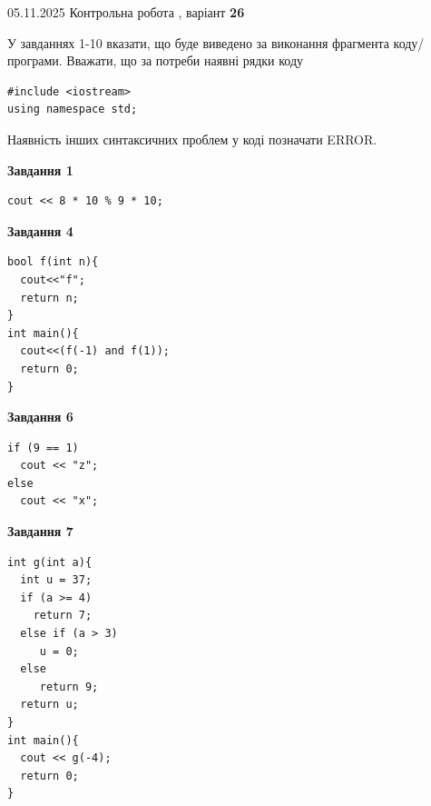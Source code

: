 \documentclass[12pt, ukrainian]{article}
\begin{document}
{\Large{05.11.2025 Контрольна робота , варіант  \No \textbf { 26 }\par}}
{
\begin {large}
У завданнях 1-10 вказати, що буде виведено за виконання фрагмента коду/про\-гра\-ми.
Вважати, що за потреби наявні рядки коду
\begin{verbatim}
#include <iostream>
using namespace std;
\end{verbatim}
Наявність інших синтаксичних проблем у коді позначати ERROR.

\begin{minipage}[t]{7.0cm}

\begin{center}
\textbf{Завдання 1}
\end{center}
\vspace{-8mm}

\begin{verbatim}
cout << 8 * 10 % 9 * 10;
\end{verbatim}



\begin{center}
\textbf{Завдання 4}
\end{center}
\vspace{-8mm}

\begin{verbatim}
bool f(int n){
  cout<<"f";
  return n;
}
int main(){
  cout<<(f(-1) and f(1));
  return 0;
}
\end{verbatim}



\begin{center}
\textbf{Завдання 6}
\end{center}
\vspace{-8mm}

\begin{verbatim}
if (9 == 1)
  cout << "z";
else
  cout << "x";
\end{verbatim}



\begin{center}
\textbf{Завдання 7}
\end{center}
\vspace{-8mm}

\begin{verbatim}
int g(int a){
  int u = 37;
  if (a >= 4)
    return 7;
  else if (a > 3)
     u = 0;
  else
     return 9;
  return u;
}
int main(){
  cout << g(-4);
  return 0;
}
\end{verbatim}


\end{minipage}
\end{large}}
\end{document}
